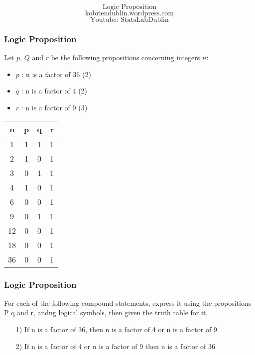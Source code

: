 \documentclass{beamer}
\begin{document}
\begin{frame}
\bigskip
{
\Huge
\[ \mbox{Logic Proposition}\]
}
{
\Large
\[ \mbox{kobriendublin.wordpress.com}\]
\[ \mbox{Youtube: StatsLabDublin}\]
}
\end{frame}





\begin{frame}
\frametitle{Logic Proposition}
Let $p$, $Q$ and $r$ be the following propositions concerning integers $n$:

\begin{itemize}
\item $p$ : n is a factor of 36 (2)
\item $q$ : n is a factor of 4 (2)
\item $r$ : n is a factor of 9 (3)
\end{itemize}
\end{frame}


\begin{frame}
\Large
\begin{center}
\begin{tabular}{|c||c|c|c|}
\hline 
\phantom{spa} \textbf{n} \phantom{spa}	& \phantom{spa}	\textbf{p} \phantom{spa}	& \phantom{spa}	\textbf{q} \phantom{spa}	& \phantom{spa}	\textbf{r} \phantom{spa}	\\ \hline \hline
1	&	1	&	1	&	1	\\ \hline
2	&	1	&	0	&	1	\\ \hline
3	&	0	&	1	&	1	\\ \hline
4	&	1	&	0	&	1	\\ \hline
6	&	0	&	0	&	1	\\ \hline
9	&	0	&	1	&	1	\\ \hline
12	&	0	&	0	&	1	\\ \hline
18	&	0	&	0	&	1	\\ \hline
36	&	0	&	0	&	1	\\
\hline 
\end{tabular} 
\end{center}
\end{frame}
\begin{frame}
\frametitle{Logic Proposition}
For each of the following compound statements, express it using the propositions P q and r, andng logical symbols, then given the truth table for it,

\begin{itemize}
\item[1)] If n is a factor of 36, then n is a factor of 4 or n is a factor of 9
\item[2)] If n is a factor of 4 or n is a factor of 9 then  n is a factor of 36
\end{itemize}
\end{frame}
\end{document}
